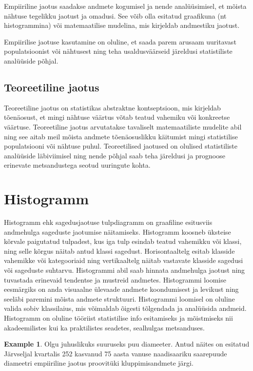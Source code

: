\documentclass[
]{book}
\theoremstyle{definition}
\theoremstyle{definition}
\newtheorem{example}{Example}[chapter]
\theoremstyle{definition}
\theoremstyle{definition}
\theoremstyle{remark}
\begin{document}
Empiiriline jaotus saadakse andmete kogumisel ja nende analüüsimisel, et mõista nähtuse tegelikku jaotust ja omadusi. See võib olla esitatud graafikuna (nt histogrammina) või matemaatilise mudelina, mis kirjeldab andmestiku jaotust.

Empiirilise jaotuse kasutamine on oluline, et saada parem arusaam uuritavast populatsioonist või nähtusest ning teha usaldusväärseid järeldusi statistiliste analüüside põhjal.

\subsection{Teoreetiline jaotus}\label{teoreetiline-jaotus}

Teoreetiline jaotus on statistikas abstraktne kontseptsioon, mis kirjeldab tõenäosust, et mingi nähtuse väärtus võtab teatud vahemiku või konkreetse väärtuse. Teoreetiline jaotus arvutatakse tavaliselt matemaatiliste mudelite abil ning see aitab meil mõista andmete tõenäosuslikku käitumist mingi statistilise populatsiooni või nähtuse puhul. Teoreetilised jaotused on olulised statistiliste analüüside läbiviimisel ning nende põhjal saab teha järeldusi ja prognoose erinevate metsandustega seotud uuringute kohta.

\section{Histogramm}\label{histogramm}

Histogramm ehk sagedusjaotuse tulpdiagramm on graafiline esitusviis andmehulga sageduste jaotumise näitamiseks. Histogramm koosneb üksteise kõrvale paigutatud tulpadest, kus iga tulp esindab teatud vahemikku või klassi, ning selle kõrgus näitab antud klassi sagedust. Horisontaaltelg esitab klasside vahemikke või kategooriaid ning vertikaaltelg näitab vastavate klasside sagedusi või sageduste suhtarvu. Histogrammi abil saab hinnata andmehulga jaotust ning tuvastada erinevaid tendentse ja mustreid andmetes. Histogrammi loomise eesmärgiks on anda visuaalne ülevaade andmete koondumisest ja levikust ning seeläbi paremini mõista andmete struktuuri. Histogrammi loomisel on oluline valida sobiv klassilaius, mis võimaldab õigesti tõlgendada ja analüüsida andmeid. Histogramm on oluline tööriist statistilise info esitamiseks ja mõistmiseks nii akadeemilistes kui ka praktilistes seadetes, sealhulgas metsanduses.

\begin{example}
Olgu juhuslikuks suuruseks puu diameeter. Antud näites on esitatud
Järvseljal kvartalis 252 kasvanud 75 aasta vanuse naadisaariku
saarepuude diameetri empiiriline jaotus proovitüki kluppimisandmete
järgi.
\end{example}
\end{document}
